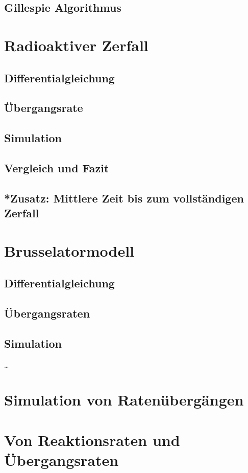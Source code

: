 \documentclass{scrartcl}
\begin{document}
\subsection{Gillespie Algorithmus}

\section{Radioaktiver Zerfall}
\subsection{Differentialgleichung}
\subsection{Übergangsrate}
\subsection{Simulation}
\subsection{Vergleich und Fazit}
\subsection{*Zusatz: Mittlere Zeit bis zum vollständigen Zerfall}

\section{Brusselatormodell}
\subsection{Differentialgleichung}
\subsection{Übergangsraten}
\subsection{Simulation}
\dots 
\section{Simulation von Ratenübergängen}
\section{Von Reaktionsraten und Übergangsraten}
\end{document}
